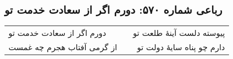 \begin{center}
\section*{رباعی شماره ۵۷۰: دورم اگر از سعادت خدمت تو}
\label{sec:sh570}
\begin{longtable}{l p{0.5cm} r}
دورم اگر از سعادت خدمت تو
&&
پیوسته دلست آینهٔ طلعت تو
\\
از گرمی آفتاب هجرم چه غمست
&&
دارم چو پناه سایهٔ دولت تو
\\
\end{longtable}
\end{center}
